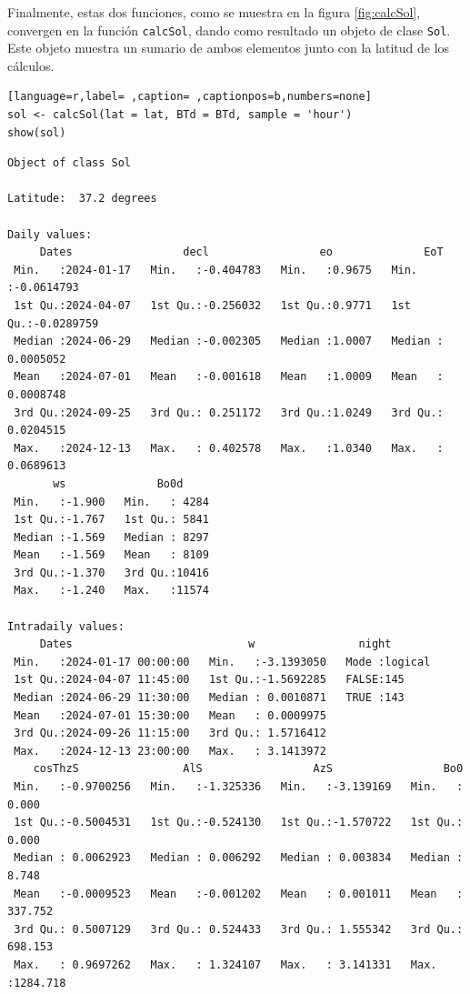 Finalmente, estas dos funciones, como se muestra en la figura \ref{fig:calcSol}, convergen en la función \texttt{calcSol}, dando como resultado un objeto de clase \texttt{Sol}. Este objeto muestra un sumario de ambos elementos junto con la latitud de los cálculos.
\begin{lstlisting}[language=r,label= ,caption= ,captionpos=b,numbers=none]
sol <- calcSol(lat = lat, BTd = BTd, sample = 'hour')
show(sol)
\end{lstlisting}

\begin{verbatim}
Object of class Sol 

Latitude:  37.2 degrees

Daily values:
     Dates                 decl                 eo              EoT            
 Min.   :2024-01-17   Min.   :-0.404783   Min.   :0.9675   Min.   :-0.0614793  
 1st Qu.:2024-04-07   1st Qu.:-0.256032   1st Qu.:0.9771   1st Qu.:-0.0289759  
 Median :2024-06-29   Median :-0.002305   Median :1.0007   Median : 0.0005052  
 Mean   :2024-07-01   Mean   :-0.001618   Mean   :1.0009   Mean   : 0.0008748  
 3rd Qu.:2024-09-25   3rd Qu.: 0.251172   3rd Qu.:1.0249   3rd Qu.: 0.0204515  
 Max.   :2024-12-13   Max.   : 0.402578   Max.   :1.0340   Max.   : 0.0689613  
       ws              Bo0d      
 Min.   :-1.900   Min.   : 4284  
 1st Qu.:-1.767   1st Qu.: 5841  
 Median :-1.569   Median : 8297  
 Mean   :-1.569   Mean   : 8109  
 3rd Qu.:-1.370   3rd Qu.:10416  
 Max.   :-1.240   Max.   :11574  

Intradaily values: 
     Dates                           w                night        
 Min.   :2024-01-17 00:00:00   Min.   :-3.1393050   Mode :logical  
 1st Qu.:2024-04-07 11:45:00   1st Qu.:-1.5692285   FALSE:145      
 Median :2024-06-29 11:30:00   Median : 0.0010871   TRUE :143      
 Mean   :2024-07-01 15:30:00   Mean   : 0.0009975                  
 3rd Qu.:2024-09-26 11:15:00   3rd Qu.: 1.5716412                  
 Max.   :2024-12-13 23:00:00   Max.   : 3.1413972                  
    cosThzS                AlS                 AzS                 Bo0          
 Min.   :-0.9700256   Min.   :-1.325336   Min.   :-3.139169   Min.   :   0.000  
 1st Qu.:-0.5004531   1st Qu.:-0.524130   1st Qu.:-1.570722   1st Qu.:   0.000  
 Median : 0.0062923   Median : 0.006292   Median : 0.003834   Median :   8.748  
 Mean   :-0.0009523   Mean   :-0.001202   Mean   : 0.001011   Mean   : 337.752  
 3rd Qu.: 0.5007129   3rd Qu.: 0.524433   3rd Qu.: 1.555342   3rd Qu.: 698.153  
 Max.   : 0.9697262   Max.   : 1.324107   Max.   : 3.141331   Max.   :1284.718
\end{verbatim}

